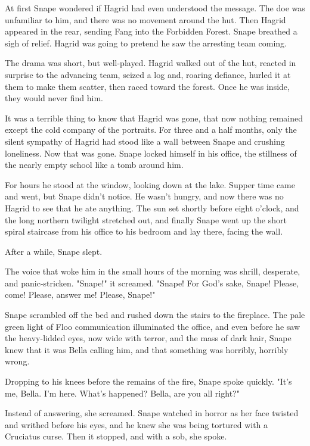 \documentclass[a4paper,11pt]{article}
\begin{document}
At first Snape wondered if Hagrid had even understood the message. The doe was unfamiliar to him, and there was no movement around the hut. Then Hagrid appeared in the rear, sending Fang into the Forbidden Forest. Snape breathed a sigh of relief. Hagrid was going to pretend he saw the arresting team coming.

The drama was short, but well-played. Hagrid walked out of the hut, reacted in surprise to the advancing team, seized a log and, roaring defiance, hurled it at them to make them scatter, then raced toward the forest. Once he was inside, they would never find him.

It was a terrible thing to know that Hagrid was gone, that now nothing remained except the cold company of the portraits. For three and a half months, only the silent sympathy of Hagrid had stood like a wall between Snape and crushing loneliness. Now that was gone. Snape locked himself in his office, the stillness of the nearly empty school like a tomb around him.

For hours he stood at the window, looking down at the lake. Supper time came and went, but Snape didn't notice. He wasn't hungry, and now there was no Hagrid to see that he ate anything. The sun set shortly before eight o'clock, and the long northern twilight stretched out, and finally Snape went up the short spiral staircase from his office to his bedroom and lay there, facing the wall.

After a while, Snape slept.

The voice that woke him in the small hours of the morning was shrill, desperate, and panic-stricken. "Snape!" it screamed. "Snape! For God's sake, Snape! Please, come! Please, answer me! Please, Snape!"

Snape scrambled off the bed and rushed down the stairs to the fireplace. The pale green light of Floo communication illuminated the office, and even before he saw the heavy-lidded eyes, now wide with terror, and the mass of dark hair, Snape knew that it was Bella calling him, and that something was horribly, horribly wrong.

Dropping to his knees before the remains of the fire, Snape spoke quickly. "It's me, Bella. I'm here. What's happened? Bella, are you all right?"

Instead of answering, she screamed. Snape watched in horror as her face twisted and writhed before his eyes, and he knew she was being tortured with a Cruciatus curse. Then it stopped, and with a sob, she spoke.
\end{document}
